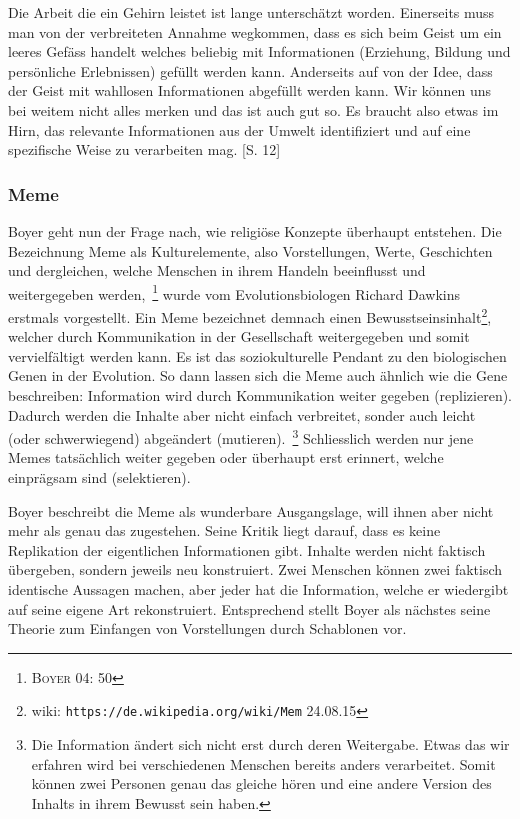 Die Arbeit die ein Gehirn leistet ist lange unterschätzt worden. Einerseits muss man von der verbreiteten Annahme wegkommen, dass es sich beim Geist um ein leeres Gefäss handelt welches beliebig mit Informationen (Erziehung, Bildung und persönliche Erlebnissen) gefüllt werden kann. Anderseits auf von der Idee, dass der Geist mit wahllosen Informationen abgefüllt werden kann. Wir können uns bei weitem nicht alles merken und das ist auch gut so. Es braucht also etwas im Hirn, das relevante Informationen aus der Umwelt identifiziert und auf eine spezifische Weise zu verarbeiten mag. [S. 12]

\subsubsection*{Meme}
Boyer geht nun der Frage nach, wie religiöse Konzepte überhaupt entstehen. Die Bezeichnung Meme als Kulturelemente, also Vorstellungen, Werte, Geschichten und dergleichen, welche Menschen in ihrem Handeln beeinflusst und weitergegeben werden,~\footnote{\textsc{Boyer} 04: 50} wurde vom Evolutionsbiologen Richard Dawkins erstmals vorgestellt. Ein Meme bezeichnet demnach einen Bewusstseinsinhalt\footnote{wiki: \texttt{https://de.wikipedia.org/wiki/Mem} 24.08.15}, welcher durch Kommunikation in der Gesellschaft weitergegeben und somit vervielfältigt werden kann. Es ist das soziokulturelle Pendant zu den biologischen Genen in der Evolution. So dann lassen sich die Meme auch ähnlich wie die Gene beschreiben: Information wird durch Kommunikation weiter gegeben (replizieren). Dadurch werden die Inhalte aber nicht einfach verbreitet, sonder auch leicht (oder schwerwiegend) abgeändert (mutieren).~\footnote{Die Information ändert sich nicht erst durch deren Weitergabe. Etwas das wir erfahren wird bei verschiedenen Menschen bereits anders verarbeitet. Somit können zwei Personen genau das gleiche hören und eine andere Version des Inhalts in ihrem Bewusst sein haben.} Schliesslich werden nur jene Memes tatsächlich weiter gegeben oder überhaupt erst erinnert, welche einprägsam sind (selektieren).

Boyer beschreibt die Meme als wunderbare Ausgangslage, will ihnen aber nicht mehr als genau das zugestehen. Seine Kritik liegt darauf, dass es keine Replikation der eigentlichen Informationen gibt. Inhalte werden nicht faktisch übergeben, sondern jeweils neu konstruiert. Zwei Menschen können zwei faktisch identische Aussagen machen, aber jeder hat die Information, welche er wiedergibt auf seine eigene Art rekonstruiert. Entsprechend stellt Boyer als nächstes seine Theorie zum Einfangen von Vorstellungen durch Schablonen vor. 

